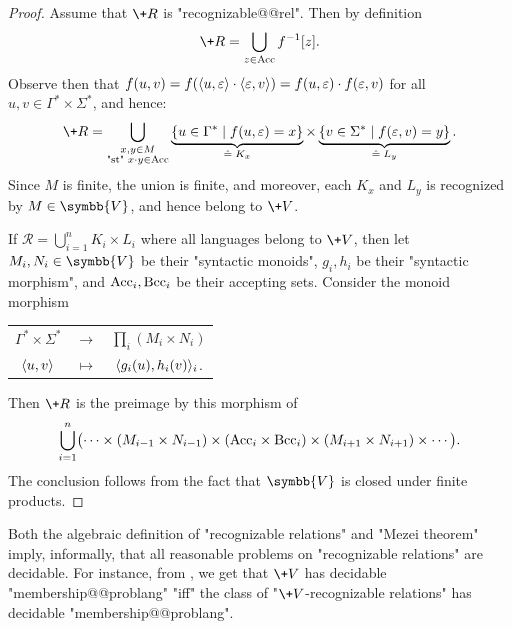 \begin{proof}
	Assume that $\+R$ is "recognizable@@rel". 
	Then by definition
	\[
		\+R = \bigcup_{z \in \Acc} f^{-1}[z].
	\]
	Observe then that $f(u,v) = f(\langle u,\varepsilon\rangle\cdot\langle\varepsilon,v\rangle)
	= f(u,\varepsilon)\cdot f(\varepsilon,v)$ for all $u,v \in \Gamma^* \times \Sigma^*$, and hence:
	\[
		\+R = \bigcup_{\substack{x,y \in M\\ \text{"st" } x\cdot y \in \Acc}}
		\underbrace{\{u \in \Gamma^* \mid f(u, \varepsilon) = x\}}_{\defeq \;K_x}
		\times \underbrace{\{v \in \Sigma^* \mid f(\varepsilon, v) = y\}}_{\defeq \;L_y}.
	\]
	Since $M$ is finite, the union is finite, and moreover, each $K_x$ and $L_y$ is
	recognized by $M \in \symbb{V}$, and hence belong to $\+V$.

	 If $\mathcal{R} = \bigcup_{i=1}^n K_i \times L_i$ 
		where all languages belong to $\+V$, then let $M_i,N_i \in \symbb{V}$
		be their "syntactic monoids", $g_i,h_i$ be their
		"syntactic morphism", and $\textrm{Acc}_i,\textrm{Bcc}_i$ be their accepting sets.
		Consider the monoid morphism
		\begin{center}
		\begin{tabular}{ccc}
			$\Gamma^* \times \Sigma^*$ & $\to$ & $\prod_{i}(M_i \times N_i)$ \\
			$\langle u,v\rangle$ & $\mapsto$ & $\langle g_i(u), h_i(v)\rangle_{i}$.
		\end{tabular}
		\end{center}
		Then $\+R$ is the preimage by this morphism of
		\[
			\bigcup_{i=1}^n \bigl(
			\cdots \times (M_{i-1}\times N_{i-1}) \times
			(\textrm{Acc}_i \times \textrm{Bcc}_i) \times (M_{i+1}\times N_{i+1}) \times \cdots \bigr).
		\]
		The conclusion follows from the fact that $\symbb{V}$ is closed under finite products.
\end{proof}

Both the algebraic definition of "recognizable relations" and
"Mezei theorem" imply, informally, that all reasonable problems on
"recognizable relations" are decidable. For instance, from ,
we get that $\+V$ has decidable "membership@@problang" "iff" the class of "$\+V$-recognizable relations"
has decidable "membership@@problang".

